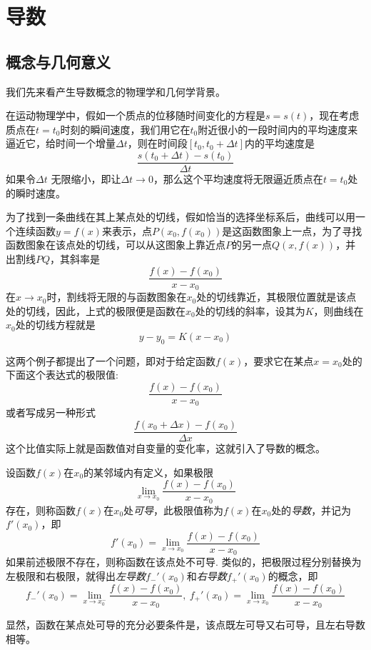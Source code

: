 
\section{导数}
\label{sec:derivative}

\subsection{概念与几何意义}
\label{sec:concept-of-derivative}

我们先来看产生导数概念的物理学和几何学背景。

在运动物理学中，假如一个质点的位移随时间变化的方程是$s=s(t)$，现在考虑质点在$t=t_0$时刻的瞬间速度，我们用它在$t_0$附近很小的一段时间内的平均速度来逼近它，给时间一个增量$\Delta t$，则在时间段$[t_0,t_0+\Delta t]$内的平均速度是
\[ \frac{s(t_0+\Delta t)-s(t_0)}{\Delta t} \]
如果令$\Delta t$ 无限缩小，即让$\Delta t \to 0$，那么这个平均速度将无限逼近质点在$t=t_0$处的瞬时速度。

为了找到一条曲线在其上某点处的切线，假如恰当的选择坐标系后，曲线可以用一个连续函数$y=f(x)$来表示，点$P(x_0,f(x_0))$是这函数图象上一点，为了寻找函数图象在该点处的切线，可以从这图象上靠近点$P$的另一点$Q(x,f(x))$，并出割线$PQ$，其斜率是
\[ \frac{f(x)-f(x_0)}{x-x_0} \]
在$x \to x_0$时，割线将无限的与函数图象在$x_0$处的切线靠近，其极限位置就是该点处的切线，因此，上式的极限便是函数在$x_0$处的切线的斜率，设其为$K$，则曲线在$x_0$处的切线方程就是
\[ y-y_0 = K(x-x_0) \]

这两个例子都提出了一个问题，即对于给定函数$f(x)$，要求它在某点$x=x_0$处的下面这个表达式的极限值:
\[ \frac{f(x)-f(x_0)}{x-x_0} \]
或者写成另一种形式
\[ \frac{f(x_0+\Delta x)-f(x_0)}{\Delta x} \]
这个比值实际上就是函数值对自变量的变化率，这就引入了导数的概念。

\begin{definition}
  设函数$f(x)$在$x_0$的某邻域内有定义，如果极限
  \[ \lim_{x \to x_0} \frac{f(x)-f(x_0)}{x-x_0} \]
  存在，则称函数$f(x)$在$x_0$处\emph{可导}，此极限值称为$f(x)$在$x_0$处的\emph{导数}，并记为$f'(x_0)$，即
  \[ f'(x_0) = \lim_{x \to x_0} \frac{f(x)-f(x_0)}{x-x_0} \]
  如果前述极限不存在，则称函数在该点处不可导. 类似的，把极限过程分别替换为左极限和右极限，就得出\emph{左导数}$f_-'(x_0)$和\emph{右导数}$f_+'(x_0)$的概念，即
  \[ f_-'(x_0) = \lim_{x \to x_0^-} \frac{f(x)-f(x_0)}{x-x_0}, \ f_+'(x_0) = \lim_{x \to x_0} \frac{f(x)-f(x_0)}{x-x_0} \]
\end{definition}

显然，函数在某点处可导的充分必要条件是，该点既左可导又右可导，且左右导数相等。

